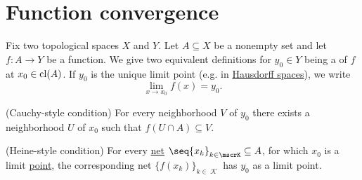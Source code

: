 \section{Function convergence}\label{sec:function_convergence}

\begin{definition}\label{def:local_convergence}
  Fix two topological spaces \( X \) and \( Y \). Let \( A \subseteq X \) be a nonempty set and let \( f: A \to Y \) be a function. We give two equivalent definitions for \( y_0 \in Y \) being a  of \( f \) at \( x_0 \in \operatorname{cl}(A) \). If \( y_0 \) is the unique limit point (e.g. in \hyperref[def:separation_axioms/T2]{Hausdorff spaces}), we write
  \begin{equation*}
    \lim_{x \to x_0} f(x) = y_0.
  \end{equation*}

  \begin{thmenum}
    (Cauchy-style condition) For every neighborhood \( V \) of \( y_0 \) there exists a neighborhood \( U \) of \( x_0 \) such that \( f(U \cap A) \subseteq V \).

    (Heine-style condition) For every \hyperref[def:topological_net]{net} \( \seq{ x_k }_{k \in \mscrK} \subseteq A \), for which \( x_0 \) is a limit \hyperref[def:net_limit_point]{point}, the corresponding net \( \{ f(x_k) \}_{k \in \mscrK} \) has \( y_0 \) as a limit point.
  \end{thmenum}
\end{definition}
